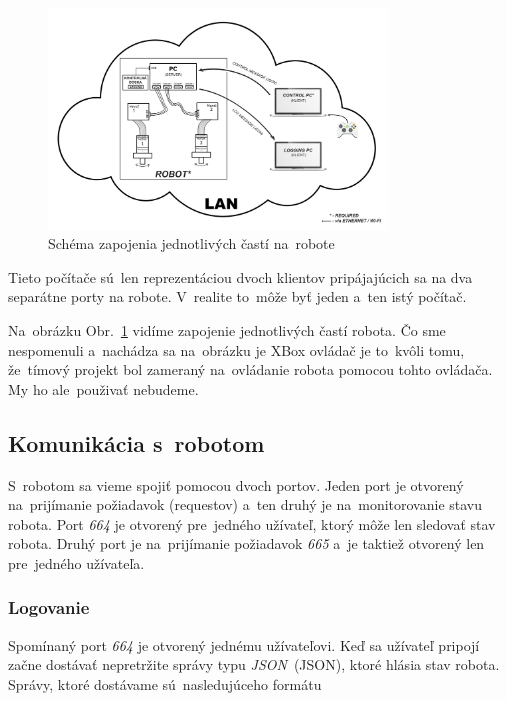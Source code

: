 \begin{figure}[!htbp]
	\begin{center}
		\includegraphics[width=9cm]{img/schemaRobota.png}
	\end{center}
	\caption{Schéma zapojenia jednotlivých častí na~robote}
	\label{fig:schemaRobota}
\end{figure}

\noindent Tieto počítače sú~len reprezentáciou dvoch klientov pripájajúcich sa na dva separátne porty na robote.
V~realite to~môže byť jeden a~ten istý počítač.

Na~obrázku Obr.~\ref{fig:schemaRobota} vidíme zapojenie jednotlivých častí robota. Čo sme nespomenuli a~nachádza
sa na~obrázku je XBox ovládač je to~kvôli tomu, že~tímový projekt bol zameraný na~ovládanie robota pomocou tohto
ovládača. My ho ale~použivať nebudeme.

\subsection{Komunikácia s~robotom}
\label{subsec:komunikacia}

S~robotom sa vieme spojiť pomocou dvoch portov. Jeden port je otvorený na~prijímanie požiadavok (requestov) a~ten
druhý je na~monitorovanie stavu robota. Port \textit{664} je otvorený pre~jedného užívateľ, ktorý môže len sledovať
stav robota. Druhý port je na~prijímanie požiadavok \textit{665} a~je taktiež otvorený len pre~jedného užívateľa.

\subsubsection{Logovanie}
\label{sec:logovanie}

	Spomínaný port \textit{664} je otvorený jednému užívateľovi. Keď sa užívateľ pripojí začne dostávať nepretržite
	správy typu \textit{JSON}~(\acrlong{JSON}), ktoré hlásia stav robota. Správy, ktoré dostávame sú~nasledujúceho
	formátu

